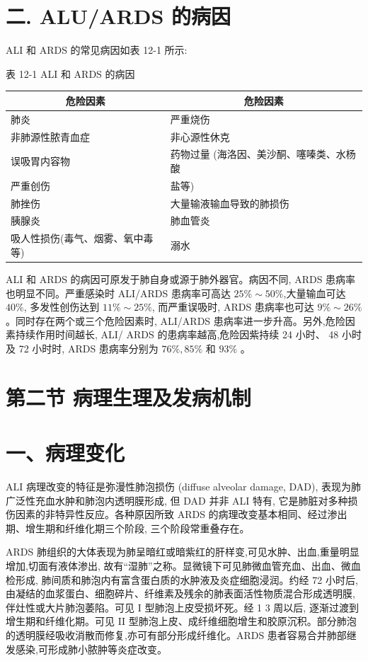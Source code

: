 \documentclass[10pt]{article}
\begin{document}
\section*{二. ALU/ARDS 的病因}
ALI 和 ARDS 的常见病因如表 12-1 所示:

表 12-1 ALI 和 ARDS 的病因

\begin{center}
\begin{tabular}{l||l}
\hline
\multicolumn{1}{c||}{危险因素} & \multicolumn{1}{c}{危险因素} \\
\hline
肺炎 & 严重烧伤 \\
非肺源性脓青血症 & 非心源性休克 \\
误吸胃内容物 & 药物过量 (海洛因、美沙酮、噻嗪类、水杨酸 \\
严重创伤 & 盐等) \\
肺挫伤 & 大量输液输血导致的肺损伤 \\
胰腺炎 & 肺血管炎 \\
吸人性损伤(毒气、烟雾、氧中毒等) & 溺水 \\
\hline
\end{tabular}
\end{center}

ALI 和 ARDS 的病因可原发于肺自身或源于肺外器官。病因不同, ARDS 患病率也明显不同。严重感染时 ALI/ARDS 患病率可高达 $25 \% \sim 50 \%$,大量输血可达 $40 \%$, 多发性创伤达到 $11 \% \sim 25 \%$, 而严重误吸时, ARDS 患病率也可达 $9 \% \sim 26 \%$ 。同时存在两个或三个危险因素时, ALI/ARDS 患病率进一步升高。另外,危险因素持续作用时间越长, ALI/ ARDS 的患病率越高,危险因紫持续 24 小时、 48 小时及 72 小时时, ARDS 患病率分别为 $76 \%, 85 \%$ 和 $93 \%$ 。

\section*{第二节 病理生理及发病机制}
\section*{一、病理变化}
$\mathrm{ALI}$ 病理改变的特征是弥漫性肺泡损伤 (diffuse alveolar damage, DAD), 表现为肺广泛性充血水肿和肺泡内透明膜形成, 但 DAD 并非 ALI 特有, 它是肺脏对多种损伤因素的非特异性反应。各种原因所致 ARDS 的病理改变基本相同、经过渗出期、增生期和纤维化期三个阶段, 三个阶段常重叠存在。

ARDS 肺组织的大体表现为肺呈暗红或暗紫红的肝样变,可见水肿、出血,重量明显增加,切面有液体渗出, 故有“湿肺”之称。显微镜下可见肺微血管充血、出血、微血检形成, 肺间质和肺泡内有富含蛋白质的水肿液及炎症细胞浸润。约经 72 小时后, 由凝结的血浆蛋白、细胞碎片、纤维素及残余的肺表面活性物质混合形成透明膜,伴灶性或大片肺泡萎陷。可见 I 型肺泡上皮受损坏死。经 1 3 周以后, 逐渐过渡到增生期和纤维化期。可见 II 型肺泡上皮、成纤维细胞增生和胶原沉积。部分肺泡的透明膜经吸收消散而修复,亦可有部分形成纤维化。ARDS 患者容易合并肺部继发感染,可形成肺小脓肿等炎症改变。
\end{document}
